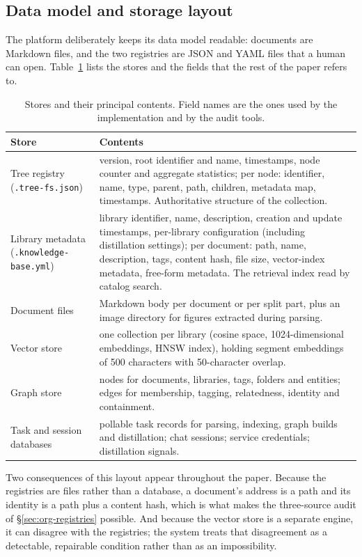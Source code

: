 \subsection{Data model and storage layout}
\label{sec:datamodel}

The platform deliberately keeps its data model readable: documents are
Markdown files, and the two registries are JSON and YAML files that a human
can open. Table~\ref{tab:datamodel} lists the stores and the fields that the
rest of the paper refers to.

\begin{table}[!htbp]
\centering
\footnotesize
\setlength{\tabcolsep}{3.5pt}
\caption{Stores and their principal contents. Field names are the ones used
by the implementation and by the audit tools.}
\label{tab:datamodel}
\begin{tabular}{p{3.1cm}p{10.4cm}}
\toprule
Store & Contents \\
\midrule
Tree registry (\texttt{.tree-fs.json}) & version, root identifier and name,
timestamps, node counter and aggregate statistics; per node:
identifier, name, type, parent, path, children, metadata map, timestamps.
Authoritative structure of the collection. \\
Library metadata (\texttt{.knowledge-base.yml}) & library identifier, name,
description, creation and update timestamps, per-library configuration
(including distillation settings); per document: path, name, description,
tags, content hash, file size, vector-index metadata, free-form metadata.
The retrieval index read by catalog search. \\
Document files & Markdown body per document or per split part, plus an image
directory for figures extracted during parsing. \\
Vector store & one collection per library (cosine space, 1024-dimensional
embeddings, HNSW index), holding segment embeddings of 500 characters with
50-character overlap. \\
Graph store & nodes for documents, libraries, tags, folders and entities;
edges for membership, tagging, relatedness, identity and containment. \\
Task and session databases & pollable task records for parsing, indexing,
graph builds and distillation; chat sessions; service credentials;
distillation signals. \\
\bottomrule
\end{tabular}
\end{table}

Two consequences of this layout appear throughout the paper. Because the
registries are files rather than a database, a document's address is a path
and its identity is a path plus a content hash, which is what makes the
three-source audit of \S\ref{sec:org-registries} possible. And because the
vector store is a separate engine, it can disagree with the registries; the
system treats that disagreement as a detectable, repairable condition rather
than as an impossibility.

